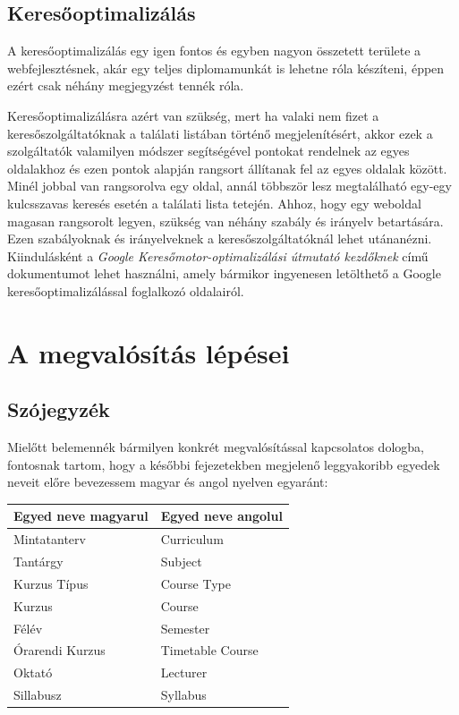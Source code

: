 \documentclass[hidelinks, 12pt, a4paper]{report}
\begin{document}
\section{Keresőoptimalizálás}

A keresőoptimalizálás egy igen fontos és egyben nagyon összetett területe a webfejlesztésnek, akár egy teljes diplomamunkát is lehetne róla készíteni, éppen ezért csak néhány megjegyzést tennék róla.

Keresőoptimalizálásra azért van szükség, mert ha valaki nem fizet a keresőszolgáltatóknak a találati listában történő megjelenítésért, akkor ezek a szolgáltatók valamilyen módszer segítségével pontokat rendelnek az egyes oldalakhoz és ezen pontok alapján rangsort állítanak fel az egyes oldalak között. Minél jobbal van rangsorolva egy oldal, annál többször lesz megtalálható egy-egy kulcsszavas keresés esetén a találati lista tetején. Ahhoz, hogy egy weboldal magasan rangsorolt legyen, szükség van néhány szabály és irányelv betartására. Ezen szabályoknak és irányelveknek a keresőszolgáltatóknál lehet utánanézni. Kiindulásként a \emph{Google Keresőmotor-optimalizálási útmutató kezdőknek} című \cite{google-seo-book} dokumentumot lehet használni, amely bármikor ingyenesen letölthető a Google keresőoptimalizálással foglalkozó oldalairól.

\chapter{A megvalósítás lépései}

\section{Szójegyzék}

Mielőtt belemennék bármilyen konkrét megvalósítással kapcsolatos dologba, fontosnak tartom, hogy a későbbi fejezetekben megjelenő leggyakoribb egyedek neveit előre bevezessem magyar és angol nyelven egyaránt:


\begin{table}[H]
	\centering
	\begin{tabular}{| l | l |}
	\hline
	\textbf{Egyed neve magyarul} & \textbf{Egyed neve angolul} \\
	\hline
	Mintatanterv & Curriculum \\
	\hline
	Tantárgy & Subject \\
	\hline
	Kurzus Típus & Course Type \\
	\hline
	Kurzus & Course \\
	\hline
	Félév & Semester \\
	\hline
	Órarendi Kurzus & Timetable Course \\
	\hline
	Oktató & Lecturer \\
	\hline
	Sillabusz & Syllabus \\
	\hline
\end{tabular}
\end{table}
\end{document}
